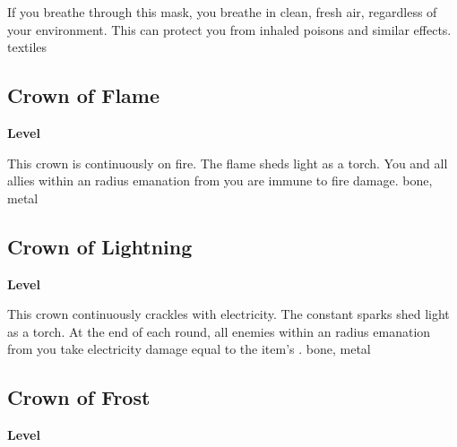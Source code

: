 \vspace{-1.5em}  %
If you breathe through this mask, you breathe in clean, fresh air, regardless of your environment.
This can protect you from inhaled poisons and similar effects.
 
 textiles
\begin{multicols}{2}
\lowercase{\hypertarget{item:Crown of Flame}{}}\label{item:Crown of Flame}
\hypertarget{item:Crown of Flame}{\subsection{Crown of Flame}}
\columnbreak%
\begin{flushright}
\large\textbf{ Level}
\end{flushright}
\end{multicols}
\vspace{-1.5em}  %
This crown is continuously on fire.
The flame sheds light as a torch.
You and all allies within an \arealarge radius emanation from you are immune to fire damage.
 
 bone, metal
\begin{multicols}{2}
\lowercase{\hypertarget{item:Crown of Lightning}{}}\label{item:Crown of Lightning}
\hypertarget{item:Crown of Lightning}{\subsection{Crown of Lightning}}
\columnbreak%
\begin{flushright}
\large\textbf{ Level}
\end{flushright}
\end{multicols}
\vspace{-1.5em}  %
This crown continuously crackles with electricity.
The constant sparks shed light as a torch.
At the end of each round, all enemies within an \areamed radius emanation from you take electricity damage equal to the item's .
 
 bone, metal
\begin{multicols}{2}
\lowercase{\hypertarget{item:Crown of Frost}{}}\label{item:Crown of Frost}
\hypertarget{item:Crown of Frost}{\subsection{Crown of Frost}}
\columnbreak%
\begin{flushright}
\large\textbf{ Level}
\end{flushright}
\end{multicols}
